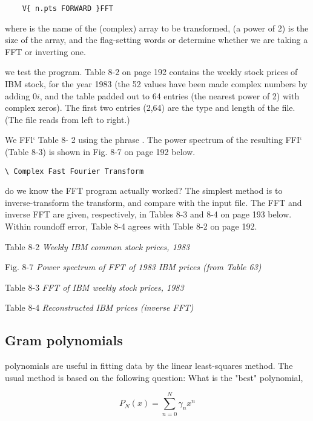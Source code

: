 \begin{lstlisting}
    V{ n.pts FORWARD }FFT
\end{lstlisting}

where  is the name of the (complex) array to be transformed,  (a power of 2) is the size of the array, and the flag-setting words  or  determine whether we are taking a FFT or inverting one.

 we test the program. Table 8-2 on page 192 contains the weekly stock prices of IBM stock, for the year 1983 (the 52 values have been made complex numbers by adding $0i$, and the table padded out to 64 entries (the nearest power of 2) with complex zeros). The first two entries (2,64) are the type and length of the file. (The file reads from left to right.)

We FFl‘ Table 8- 2 using the phrase . The power spectrum of the resulting FFI‘ (Table 8-3) is shown in Fig. 8-7 on page 192 below.

\begin{lstlisting}
\ Complex Fast Fourier Transform

\end{lstlisting}

 do we know the FFT program actually worked? The simplest method is to inverse-transform the transform, and compare with the input file. The FFT and inverse FFT are given, respectively, in Tables 8-3 and 8-4 on page 193 below. Within roundoff error, Table 8-4 agrees with Table 8-2 on page 192.

Table 8-2 \textit{Weekly IBM common stock prices, 1983}

Fig. 8-7 \textit{Power spectrum of FFT of 1983 IBM prices (from Table 63)}

Table 8-3 \textit{FFT of IBM weekly stock prices, 1983}

Table 8-4 \textit{Reconstructed IBM prices (inverse FFT)}

\subsection{Gram polynomials}
 polynomials are useful in fitting data by the linear least-squares method. The usual method is based on the following question: What is the "best" polynomial,

\begin{equation}
P_N(x) = \sum_{n=0}^N \gamma_n x^n
\end{equation}

